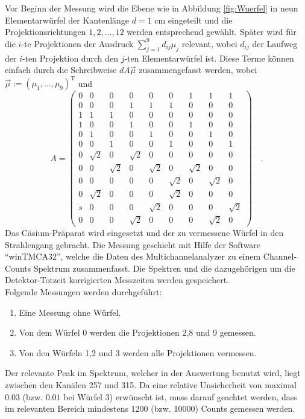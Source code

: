 Vor Beginn der Messung wird die Ebene wie in Abbildung \ref{fig:Wuerfel} in neun Elementarwürfel 
der Kantenlänge $d=1$ cm eingeteilt und die Projektionsrichtungen $1,2,\ldots,12$ werden 
entsprechend gewählt. Später wird für die $i$-te Projektionen der Ausdruck $\sum_{j=1}^9 
d_{ij}\mu_j$  relevant, wobei $d_{ij}$ der Laufweg der $i$-ten Projektion durch den $j$-ten 
Elementarwürfel ist. Diese Terme können einfach durch die Schreibweise $d A\vec{\mu}$ 
zusammengefasst werden, wobei $\vec{\mu}:=(\mu_1,\ldots,\mu_9)^\text{T}$ und 
\begin{equation}
A=
\begin{pmatrix}
0	&0	&0	&0	&0	&0	&1	&1	&1	\\
0	&0	&0	&1	&1	&1	&0	&0	&0	\\
1	&1	&1	&0	&0	&0	&0	&0	&0	\\
1	&0	&0	&1	&0	&0	&1	&0	&0	\\
0	&1	&0	&0	&1	&0	&0	&1	&0	\\
0	&0	&1	&0	&0	&1	&0	&0	&1	\\
0	&\sqrt{2}	&0	&\sqrt{2}	&0	&0	&0	&0	&0	\\
0	&0	&\sqrt{2}	&0	&\sqrt{2}	&0	&\sqrt{2}	&0	&0	\\
0	&0	&0	&0	&0	&\sqrt{2}	&0	&\sqrt{2}	&0	\\
0	&\sqrt{2}	&0	&0	&0	&\sqrt{2}	&0	&0	&0	\\
s	&0	&0	&0	&\sqrt{2}	&0	&0	&0	&\sqrt{2}	\\
0	&0	&0	&\sqrt{2}	&0	&0	&0	&\sqrt{2}	&0	
\end{pmatrix} \quad . \label{eq:Matrix}
\end{equation}
Das Cäsium-Präparat wird eingesetzt und der zu vermessene Würfel in den Strahlengang gebracht. 
Die Messung geschieht mit Hilfe der Software "`winTMCA32"', welche die Daten des 
Multichannelanalyzer zu einem Channel-Counts Spektrum zusammenfasst. Die Spektren und die 
dazugehörigen um die Detektor-Totzeit korrigierten Messzeiten werden 
gespeichert.\\
Folgende Messungen werden durchgeführt:
\begin{enumerate}
\item Eine Messung ohne Würfel.
\item Von dem Würfel 0 werden die Projektionen 2,8 und 9 gemessen.
\item Von den Würfeln 1,2 und 3 werden alle Projektionen vermessen.
\end{enumerate}
Der relevante Peak im Spektrum, welcher in der Auswertung benutzt wird, liegt zwischen den 
Kanälen 257 und 315. Da eine relative Unsicherheit von maximal $0.03$ (bzw. $0.01$ bei Würfel 3) 
erwünscht ist, muss darauf geachtet werden, dass im relevanten Bereich mindestens 1200 (bzw. 
10000) Counts gemessen werden. 